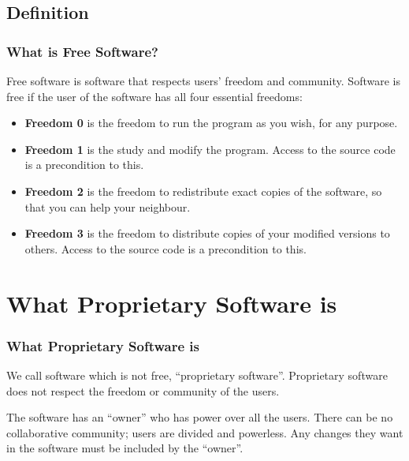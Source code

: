 \documentclass{beamer}
\begin{document}

\subsection{Definition}

\begin{frame}
\frametitle{What is Free Software?}

Free software is software that respects users' freedom and community.
Software is free if the user of the software has all four essential freedoms:

\begin{itemize}
\item {\bf Freedom 0} is the freedom to run the program as you wish, 
  for any purpose.
\item {\bf Freedom 1} is the study and modify the program. 
  Access to the source code is a precondition to this.
\item {\bf Freedom 2} is the freedom to redistribute exact copies of the 
  software, so that you can help your neighbour.
\item {\bf Freedom 3} is the freedom to distribute copies of your 
  modified versions to others. Access to the source code is a precondition 
  to this.
\end{itemize}
\end{frame}


\section{What Proprietary Software is}

\begin{frame}
\frametitle{What Proprietary Software is}

We call software which is not free, ``proprietary software''.
Proprietary software does not respect the freedom or community of the users.

The software has an ``owner'' who has power over all the users.
There can be no collaborative community; users are divided and 
powerless. Any changes they want in the software must be included by
the ``owner''.


\end{frame}

\end{document}

